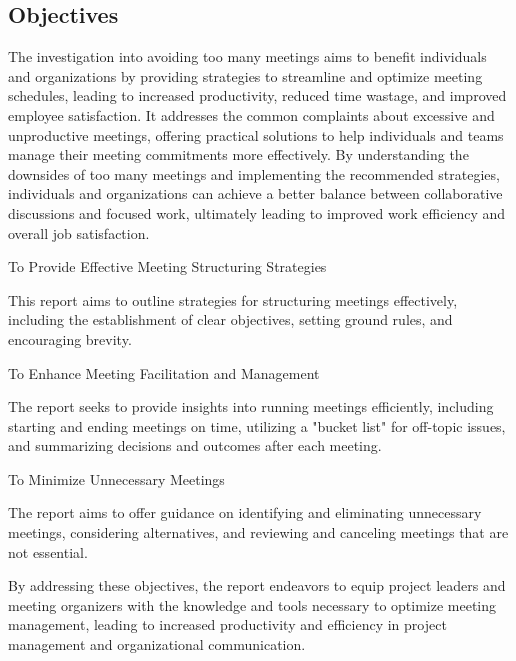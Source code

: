 \documentclass[runningheads]{llncs}
\begin{document}
\subsection{Objectives}
The investigation into avoiding too many meetings aims to benefit individuals and organizations by providing strategies to streamline and optimize meeting schedules, leading to increased productivity, reduced time wastage, and improved employee satisfaction. It addresses the common complaints about excessive and unproductive meetings, offering practical solutions to help individuals and teams manage their meeting commitments more effectively. By understanding the downsides of too many meetings and implementing the recommended strategies, individuals and organizations can achieve a better balance between collaborative discussions and focused work, ultimately leading to improved work efficiency and overall job satisfaction.
\begin{enumerate}
   {\bfseries  \item To Provide Effective Meeting Structuring Strategies}
   This report aims to outline strategies for structuring meetings effectively, including the establishment of clear objectives, setting ground rules, and encouraging brevity.
    {\bfseries \item  To Enhance Meeting Facilitation and Management }
    The report seeks to provide insights into running meetings efficiently, including starting and ending meetings on time, utilizing a "bucket list" for off-topic issues, and summarizing decisions and outcomes after each meeting.
    {\bfseries \item To Minimize Unnecessary Meetings}
    The report aims to offer guidance on identifying and eliminating unnecessary meetings, considering alternatives, and reviewing and canceling meetings that are not essential.
\end{enumerate}
By addressing these objectives, the report endeavors to equip project leaders and meeting organizers with the knowledge and tools necessary to optimize meeting management, leading to increased productivity and efficiency in project management and organizational communication.
\end{document}
